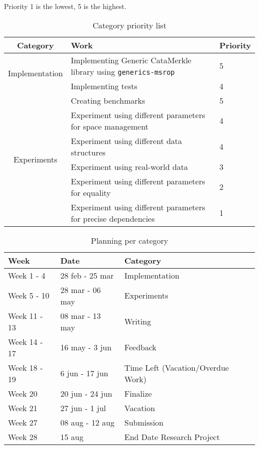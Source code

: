 Priority 1 is the lowest, 5 is the highest.
\begin{table}[H]
    \setlength{\tabcolsep}{8pt}
    \centering
    \small
    \bigskip
    \begin{tabular}{|c|l|l|}
        \hline
        Category & Work & Priority \\
        \hline
        \multirow{2}{7em}{Implementation} & Implementing Generic CataMerkle library using \texttt{generics-msrop} & 5 \\
         & Implementing tests & 4 \\
        \hline
        \multirow{6}{7em}{Experiments} & Creating benchmarks & 5 \\
         & Experiment using different parameters for space management & 4 \\
         & Experiment using different data structures & 4 \\
         & Experiment using real-world data & 3 \\
         & Experiment using different parameters for equality & 2 \\
         & Experiment using different parameters for precise dependencies & 1 \\
        \hline
    \end{tabular}
\caption{Category priority list}
\label{table:priorities}
\end{table}

\begin{table}[H]
\setlength{\tabcolsep}{8pt}
\centering
\small
\bigskip
\begin{tabular}{|l|l|l|}
    \hline
    Week & Date & Category \\
    \hline
    Week 1 - 4 & 28 feb - 25 mar & Implementation \\
    \hline
    Week 5 - 10 & 28 mar - 06 may & Experiments \\
    \hline
    Week 11 - 13 & 08 mar - 13 may & Writing \\
    \hline
    Week 14 - 17 & 16 may - 3 jun & Feedback \\
    \hline
    Week 18 - 19 & 6 jun - 17 jun & Time Left (Vacation/Overdue Work) \\
    \hline
    Week 20 & 20 jun - 24 jun & Finalize \\
    \hline
    Week 21 & 27 jun - 1 jul & Vacation \\
    \hline
    Week 27 & 08 aug - 12 aug & Submission \\
    \hline 
    Week 28 & 15 aug & End Date Research Project  \\
    \hline
\end{tabular}
\caption{Planning per category}
\label{table:planning}
\end{table}